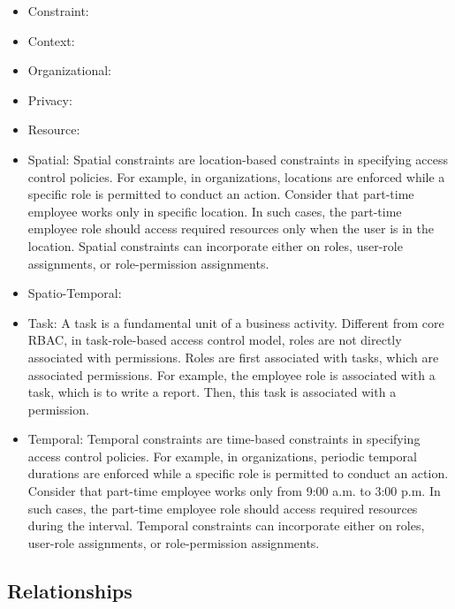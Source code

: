 \begin{itemize}

  \item Constraint:

  \item Context:

  \item Organizational:

  \item Privacy:

  \item Resource:

  \item Spatial:  Spatial constraints are location-based constraints in specifying access
	control policies. For example, in organizations, 	locations are enforced while a
	specific role is permitted to conduct an action. Consider that part-time employee works only in specific location.
	In such cases, the part-time employee role should access required resources only when the user is in the location. 
	Spatial constraints can incorporate either on roles, user-role assignments, or role-permission assignments. 

  \item Spatio-Temporal:

  \item Task: A task is a fundamental unit of a business activity. Different from core RBAC, in task-role-based access control model, roles are not directly associated with permissions. Roles are first associated with tasks, which are associated permissions. For example, the employee role is associated with a task, which is to write a report. Then, this task is associated with a permission.

  \item Temporal:  Temporal constraints are time-based constraints in specifying access
	control policies. For example, in organizations, 	periodic temporal durations are enforced while a
	specific role is permitted to conduct an action. Consider that part-time employee works only from 9:00 a.m. to 3:00 p.m.
	In such cases, the part-time employee role should access required resources during the interval. 
	Temporal constraints can incorporate either on roles, user-role assignments, or role-permission assignments.   
	
\end{itemize}

\subsection{Relationships}
